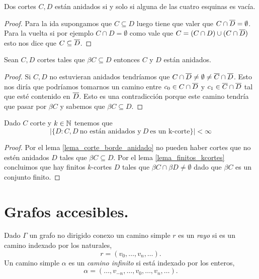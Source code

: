 \documentclass[tesis.tex]{subfiles}
\begin{document}
\begin{lema}
	Dos cortes $C,D$ están anidados si y solo si alguna de las cuatro esquinas es vacía.
\end{lema}
\begin{proof}
	Para la ida supongamos que $C \subseteq D$ luego tiene que valer que $C \cap \overline D = \emptyset$.
	Para la vuelta si por ejemplo $C \cap D = \emptyset$ como vale que $C = (C \cap D) \cup (C \cap \overline D)$ esto nos dice que $C \subseteq \overline D$.
	
\end{proof}

\begin{lema}\label{lema_corte_borde_anidado}
	Sean $C,D$ cortes tales que $\beta C \subseteq D$ entonces $C$ y $D$ están anidados.
\end{lema}
\begin{proof}
	Si $C,D$ no estuvieran anidados tendríamos que $C \cap \overline D \neq \emptyset \neq \overline C \cap \overline D$.
	Esto nos diría que podríamos tomarnos un camino entre $c_0 \in C \cap \overline D$ y $c_1 \in \overline C \cap \overline D$ tal que esté contenido en $\overline D$.
	Esto es una contradicción porque este camino tendría que pasar por $\beta C$ y sabemos que $\beta C \subseteq D$.
	
\end{proof}


\begin{lema}
	Dado $C$ corte y $k \in \mathbb{N}$ tenemos que 
	\[
	| \{  D : C, D \ \text{no están anidados y} \ D \ \text{es un k-corte}   \} | < \infty
	\]
\end{lema}
\begin{proof}
	Por el lema \ref{lema_corte_borde_anidado} no pueden haber cortes que no estén anidados $D$ tales que $\beta C \subseteq D$.
	Por el lema \ref{lema_finitos_kcortes} concluimos que hay finitos $k$-cortes $D$ tales que $\beta C \cap \beta D \neq \emptyset$ dado que $\beta C$ es un conjunto finito.
				
\end{proof}


\section{Grafos accesibles.}\label{secc_grafos_accesibles}

\begin{deff}
	Dado $\Gamma$ un grafo no dirigido conexo un camino simple $r$ es un \emph{rayo} si es un camino indexado por los naturales,
	\[
	r = (v_0, \dots, v_{n}, \dots).
	\]	
	Un camino simple $\alpha$ es un \emph{camino infinito} si está indexado por los enteros,
	\[
	\alpha = ( \dots, v_{-n}, \dots, v_0, \dots, v_{n}, \dots ).
	\]
\end{deff}		
\end{document}
